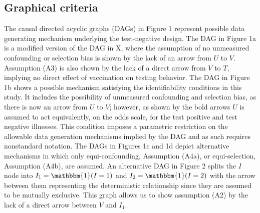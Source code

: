 \documentclass[11pt]{article}
\begin{document}
\subsection{Graphical criteria} \label{sec:graphical}
The causal directed acyclic graphs (DAGs) in Figure 1 represent possible data generating mechanism underlying the test-negative design. The DAG in Figure 1a is a modified version of the DAG in X, where the assumption of no unmeasured confounding or selection bias is shown by the lack of an arrow from $U$ to $V$. Assumption (A3) is also shown by the lack of a direct arrow from $V$ to $T$, implying no direct effect of vaccination on testing behavior. The DAG in Figure 1b shows a possible mechanism satisfying the identifiability conditions in this study. It includes the possibility of unmeasured confounding and selection bias, as there is now an arrow from $U$ to $V$; however, as shown by the bold arrows $U$ is assumed to act equivalently, on the odds scale, for the test positive and test negative illnesses. This condition imposes a parametric restriction on the allowable data generation mechanisms implied by the DAG and as such requires nonstandard notation. The DAGs in Figures 1c and 1d depict alternative mechanisms in which only equi-confounding, Assumption (A4a), or equi-selection, Assumption (A4b), are assumed. An alternative DAG in Figure 2 splits the $I$ node into $I_1 = \mathbbm{1}(I = 1)$ and $I_2 = \mathbbm{1}(I = 2)$ with the arrow between them representing the deterministic relationship since they are assumed to be mutually exclusive. This graph allows us to show assumption (A2) by the lack of a direct arrow between $V$ and $I_1$. 
\end{document}
